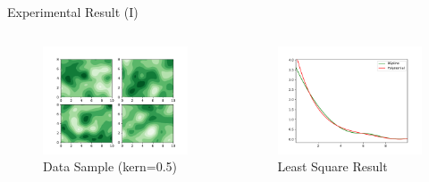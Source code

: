 \documentclass[
  ignorenonframetext,
  aspectratio=169,
  serif,onlymath]{beamer}
\begin{document}
\begin{frame}{Experimental Result (I)}
\protect\hypertarget{experimental-result-i}{}

\begin{columns}

\begin{figure}
\centering
\includegraphics{ellipsoid.files/iso050.pdf}
\caption{Data Sample (kern=0.5)}
\end{figure}


\begin{figure}
\centering
\includegraphics{ellipsoid.files/result050.pdf}
\caption{Least Square Result}
\end{figure}

\end{columns}

\end{frame}
\end{document}

